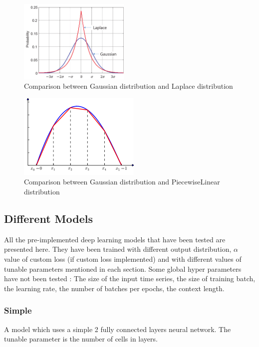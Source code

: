 \documentclass[a4paper, 12pt]{article}
\begin{document}
\begin{figure}
    \centering
    \includegraphics[width=200px]{Gaussian-distribution-and-Laplace-distribution.ppm.png}
    \caption{Comparison between Gaussian distribution and Laplace distribution}
    \label{fig:gausslaplace}
\end{figure}

\begin{figure}
    \centering
    \includegraphics{220px-Finite_element_method_1D_illustration1.svg.png}
    \caption{Comparison between Gaussian distribution and PiecewiseLinear distribution}
    \label{fig:gausslaplace}
\end{figure}

\subsection{Different Models}


All the pre-implemented deep learning models that have been tested  are presented here.
They have been trained with different output distribution, $\alpha$ value of custom loss (if custom loss implemented) and with different values of tunable parameters mentioned in each section.
Some global hyper parameters have not been tested : The size of the input time series, the size of training batch, the learning rate, the number of batches per epochs, the context length.



\subsubsection{Simple}
A model which uses a simple 2 fully connected layers neural network.
The tunable parameter is the number of cells in layers.
\end{document}
